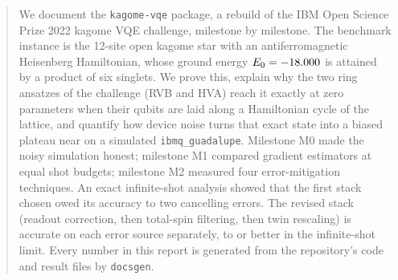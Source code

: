 \documentclass[nominted]{fatreport}
\begin{document}
\maketitle
\thispagestyle{fancy}

\begin{abstract}
  We document the \texttt{kagome-vqe} package, a rebuild of the IBM Open Science Prize 2022
  kagome VQE challenge, milestone by milestone. The benchmark instance is the 12-site open
  kagome star with an antiferromagnetic Heisenberg Hamiltonian, whose ground energy
  $E_0=\VExactE$ is attained by a product of six singlets. We prove this, explain why the two
  ring ansatzes of the challenge (RVB and HVA) reach it exactly at zero parameters when their
  qubits are laid along a Hamiltonian cycle of the lattice, and quantify how device noise turns
  that exact state into a biased plateau near \VPostFinalMax{} on a simulated
  \texttt{ibmq\_guadalupe}. Milestone M0 made the noisy simulation honest; milestone M1
  compared gradient estimators at equal shot budgets; milestone M2 measured four error-mitigation
  techniques. An exact infinite-shot analysis showed that the first stack chosen owed its
  accuracy to two cancelling errors. The revised stack (readout correction, then total-spin
  filtering, then twin rescaling) is accurate on each error source separately, to
  \VMxTwMax{} or better in the infinite-shot limit. Every number in this report is generated
  from the repository's code and result files by \texttt{docsgen}.
\end{abstract}

\tableofcontents
\newpage










\printbibliography

\appendix

\end{document}
